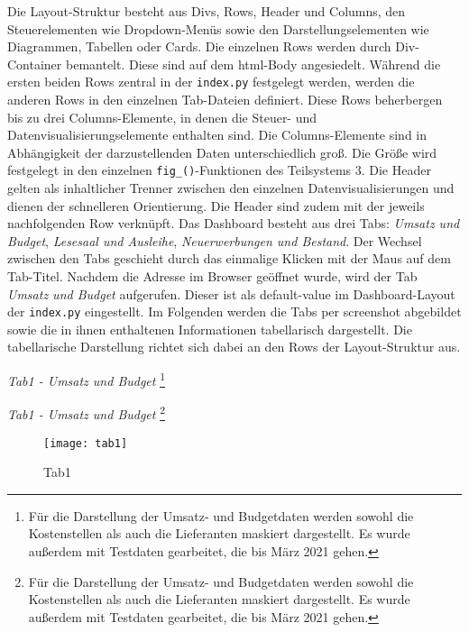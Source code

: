     Die Layout-Struktur besteht aus Divs, Rows, Header und Columns, den Steuerelementen wie Dropdown-Menüs sowie den Darstellungselementen wie Diagrammen, Tabellen
    oder Cards. Die einzelnen Rows werden durch Div-Container bemantelt. Diese sind auf dem html-Body angesiedelt.
    Während die ersten beiden Rows zentral in der \texttt{index.py} festgelegt werden, werden die anderen Rows in den einzelnen Tab-Dateien definiert. 
    Diese Rows beherbergen bis zu drei Columns-Elemente, in denen die Steuer- und Datenvisualisierungselemente enthalten sind.
    Die Columns-Elemente sind in Abhängigkeit der darzustellenden Daten unterschiedlich groß. 
    Die Größe wird festgelegt in den einzelnen \texttt{fig\_()}-Funktionen des Teilsystems 3.
    Die Header gelten als inhaltlicher Trenner zwischen den einzelnen Datenvisualisierungen und dienen der schnelleren Orientierung. 
    Die Header sind zudem mit der jeweils nachfolgenden Row verknüpft. Das Dashboard besteht aus drei Tabs: \textit{Umsatz und Budget}, 
    \textit{Lesesaal und Ausleihe}, \textit{Neuerwerbungen und Bestand}. Der Wechsel zwischen den Tabs geschieht durch das einmalige
    Klicken mit der Maus auf dem Tab-Titel. Nachdem die Adresse im Browser geöffnet wurde, wird der Tab \textit{Umsatz und Budget} aufgerufen. Dieser ist
    als default-value im Dashboard-Layout der \texttt{index.py} eingestellt. Im Folgenden werden die Tabs per screenshot abgebildet sowie 
    die in ihnen enthaltenen Informationen tabellarisch dargestellt. Die tabellarische Darstellung richtet sich dabei an den Rows der Layout-Struktur aus. 

    \noindent
    \textit{Tab1 - Umsatz und Budget}
    \footnote{Für die Darstellung der Umsatz- und
    Budgetdaten werden sowohl die Kostenstellen als auch die Lieferanten maskiert dargestellt. Es wurde außerdem mit Testdaten
    gearbeitet, die bis März 2021 gehen.}

    \recalctypearea
    
    \textit{Tab1 - Umsatz und Budget}
    \footnote{Für die Darstellung der Umsatz- und
    Budgetdaten werden sowohl die Kostenstellen als auch die Lieferanten maskiert dargestellt. Es wurde außerdem mit Testdaten
    gearbeitet, die bis März 2021 gehen.}
    \begin{figure}[H]
        \centering
            \texttt{[image: tab1]}
            \caption{Tab1}
            \label{fig:tab1}
    \end{figure}


